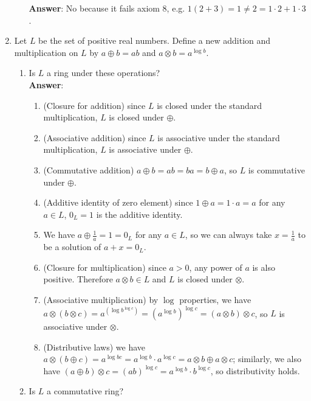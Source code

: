 \documentclass{article}
\begin{document}
\begin{enumerate}
\begin{enumerate}
                        \textbf{Answer}: No because it fails axiom 8, e.g. $1(2+3)=1\neq 2=1\cdot 2+1\cdot 3$.
            \end{enumerate}
      \item Let $L$ be the set of positive real numbers. Define a new addition and multiplication on $L$ by $a\oplus b=ab$ and $a\otimes b=a^{\log b}$.
            \begin{enumerate}
                  \item Is $L$ a ring under these operations?\\
                        \textbf{Answer}:
                        \begin{enumerate}
                              \item (Closure for addition) since $L$ is closed under the standard multiplication, $L$ is closed under $\oplus$.
                              \item (Associative addition) since $L$ is associative under the standard multiplication, $L$ is associative under $\oplus$.
                              \item (Commutative addition) $a\oplus b=ab=ba=b\oplus a$, so $L$ is commutative under $\oplus$.
                              \item (Additive identity of zero element) since $1\oplus a=1\cdot a=a$ for any $a\in L$, $0_L=1$ is the additive identity.
                              \item We have $a\oplus\frac{1}{a}=1=0_L$ for any $a\in L$, so we can always take $x=\frac{1}{a}$ to be a solution of $a+x=0_L$.
                              \item (Closure for multiplication) since $a>0$, any power of $a$ is also positive. Therefore $a\otimes b\in L$ and $L$ is closed under $\otimes$.
                              \item (Associative multiplication) by $\log$ properties, we have $a\otimes (b\otimes c)=a^{(\log b^{\log c})}=(a^{\log b})^{\log c}=(a\otimes b)\otimes c$, so $L$ is associative under $\otimes$.
                              \item (Distributive laws) we have $a\otimes(b\oplus c)=a^{\log bc}=a^{\log b}\cdot a^{\log c}=a\otimes b\oplus a\otimes c$; similarly, we also have $(a\oplus b)\otimes c=(ab)^{\log c}=a^{\log b}\cdot b^{\log c}$, so distributivity holds.
                        \end{enumerate}
                  \item Is $L$ a commutative ring?\\

\end{enumerate}
\end{enumerate}
\end{document}
